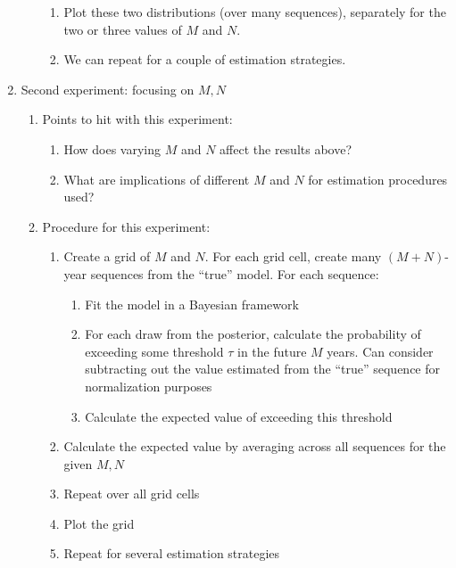 \begin{enumerate}
\begin{enumerate}
\begin{enumerate}
      \item Plot these two distributions (over many sequences), separately for the two or three values of $M$ and $N$.
      \item We can repeat for a couple of estimation strategies.
    \end{enumerate}
  \end{enumerate}
  \item Second experiment: focusing on $M,N$
  \begin{enumerate}
    \item Points to hit with this experiment:
    \begin{enumerate}
      \item How does varying $M$ and $N$ affect the results above?
      \item What are implications of different $M$ and $N$ for estimation procedures used?
    \end{enumerate}
    \item Procedure for this experiment:
    \begin{enumerate}
      \item Create a grid of $M$ and $N$. For each grid cell, create many $(M+N)$-year sequences from the ``true'' model. For each sequence:
      \begin{enumerate}
        \item Fit the model in a Bayesian framework
        \item For each draw from the posterior, calculate the probability of exceeding some threshold $\tau$ in the future $M$ years. Can consider subtracting out the value estimated from the ``true'' sequence for normalization purposes
        \item Calculate the expected value of exceeding this threshold
      \end{enumerate}
      \item Calculate the expected value by averaging across all sequences for the given $M,N$
      \item Repeat over all grid cells
      \item Plot the grid
      \item Repeat for several estimation strategies
    \end{enumerate}
  \end{enumerate}
\end{enumerate}


